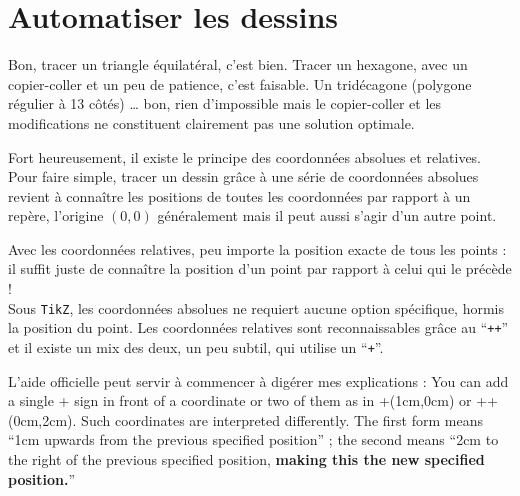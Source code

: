 
\section{Automatiser les dessins}

Bon, tracer un triangle équilatéral, c'est bien. Tracer un hexagone, avec un copier-coller et un peu de patience, c'est faisable. Un tridécagone (polygone régulier à 13 côtés) \dots{} bon, rien d'impossible mais le copier-coller et les modifications ne constituent clairement pas une solution optimale.

Fort heureusement, il existe le principe des coordonnées absolues et relatives. Pour faire simple, tracer un dessin grâce à une série de coordonnées absolues revient à connaître les positions de toutes les coordonnées par rapport à un repère, l'origine $(0,0)$ généralement mais il peut aussi s'agir d'un autre point.

Avec les coordonnées relatives, peu importe la position exacte de tous les points : il suffit juste de connaître la position d'un point par rapport à celui qui le précède ! \\

Sous \texttt{TikZ}, les coordonnées absolues ne requiert aucune option spécifique, hormis la position du point. Les coordonnées relatives sont reconnaissables grâce au ``\verb?++?'' et il existe un mix des deux, un peu subtil, qui utilise un ``\verb?+?''.

L'aide officielle peut servir à commencer à digérer mes explications : \og You can add a single + sign in front of a coordinate or two of them as in +(1cm,0cm) or ++(0cm,2cm). Such coordinates are interpreted differently. The first form means ``1cm upwards from the previous specified position'' ; the second means ``2cm to the right of the previous specified position, \textbf{making this the new specified position.}'' \fg{}


